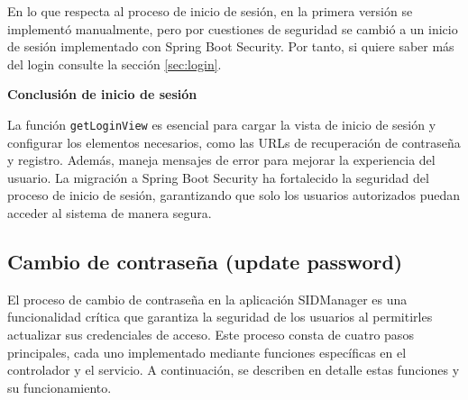 \documentclass[draft]{scrbook}
\begin{document}
En lo que respecta al proceso de inicio de sesión, en la primera versión se implementó manualmente, pero por cuestiones de seguridad se cambió a un inicio de sesión implementado con Spring Boot Security. Por tanto, si quiere saber más del login consulte la sección \ref{sec:login}.

\textbf{Conclusión de inicio de sesión}

La función \texttt{getLoginView} es esencial para cargar la vista de inicio de sesión y configurar los elementos necesarios, como las URLs de recuperación de contraseña y registro. Además, maneja mensajes de error para mejorar la experiencia del usuario. La migración a Spring Boot Security ha fortalecido la seguridad del proceso de inicio de sesión, garantizando que solo los usuarios autorizados puedan acceder al sistema de manera segura.

\subsection{Cambio de contraseña (update password)}
\label{subsec:update-password}

El proceso de cambio de contraseña en la aplicación SIDManager es una funcionalidad crítica que garantiza la seguridad de los usuarios al permitirles actualizar sus credenciales de acceso. Este proceso consta de cuatro pasos principales, cada uno implementado mediante funciones específicas en el controlador y el servicio. A continuación, se describen en detalle estas funciones y su funcionamiento.
\end{document}
